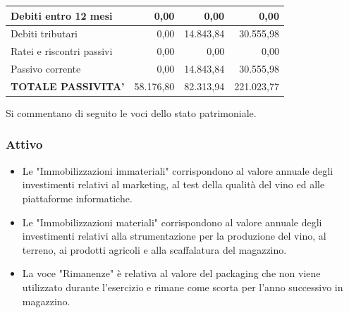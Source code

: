 \documentclass[12pt, a4paper]{article}
\begin{document}
\begin{center}
\begin{tabular}{|l|r|r|r|}
        Debiti entro 12 mesi                                           & 0,00                                                          & 0,00                                                          & 0,00                                                          \\ \hline
        Debiti tributari                                               & 0,00                                                          & 14.843,84                                                     & 30.555,98                                                     \\ \hline
        Ratei e riscontri passivi                                      & 0,00                                                          & 0,00                                                          & 0,00                                                          \\ \hline
        Passivo corrente                                               & 0,00                                                          & 14.843,84                                                     & 30.555,98                                                     \\ \hline
        \rowcolor[HTML]{CBCEFB}
        \textbf{TOTALE PASSIVITA'}                                     & 58.176,80                                                     & 82.313,94                                                     & 221.023,77                                                    \\ \hline
    \end{tabular}
\end{center}
\newpage\noindent
Si commentano di seguito le voci dello stato patrimoniale.
\subsubsection*{Attivo}
\begin{itemize}
    \item Le "Immobilizzazioni immateriali" corrispondono al valore annuale degli investimenti relativi al marketing, al test della qualità del vino ed alle piattaforme informatiche.
    \item Le "Immobilizzazioni materiali" corrispondono al valore annuale degli investimenti relativi alla strumentazione per la produzione del vino, al terreno, ai prodotti agricoli e alla scaffalatura del magazzino.
    \item La voce "Rimanenze" è relativa al valore del packaging che non viene utilizzato durante l'esercizio e rimane come scorta per l'anno successivo in magazzino.
\end{itemize}
\end{document}
